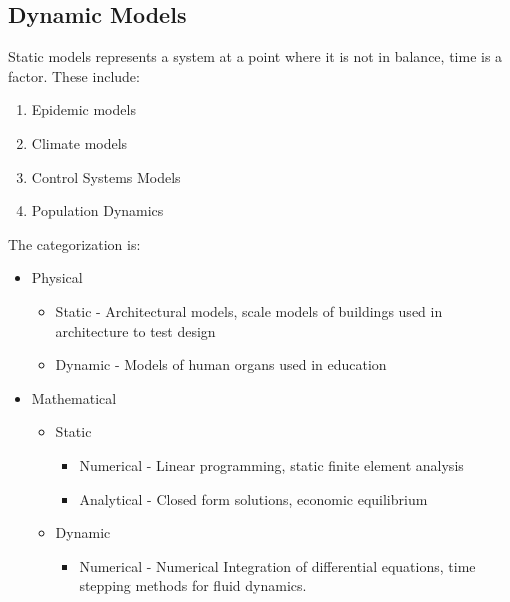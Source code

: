 \documentclass[twoside]{report}
\begin{document}
\subsection{Dynamic Models}
Static models represents a system at a point where it is not in balance, time is a factor.
These include:
\begin{enumerate}
	\item Epidemic models
	\item Climate models
	\item Control Systems Models
	\item Population Dynamics
\end{enumerate}

The categorization is:
\begin{itemize}
	\item Physical
		\begin{itemize}
			\item Static - Architectural models, scale models of buildings used in architecture to test design
			\item Dynamic - Models of human organs used in education
		\end{itemize}
	\item Mathematical
		\begin{itemize}
			\item Static 
				\begin{itemize}
					\item Numerical - Linear programming, static finite element analysis 
					\item Analytical - Closed form solutions, economic equilibrium 
				\end{itemize}
			\item Dynamic
				\begin{itemize}
					\item Numerical - Numerical Integration of differential equations, time stepping methods for fluid dynamics.
				\end{itemize}
		\end{itemize}
\end{itemize}
\end{document}
